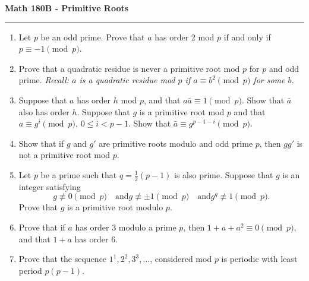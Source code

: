 \documentclass[11pt,letterpaper]{report}
\begin{document}
\begin{center}
{\bf \Large Math 180B - Primitive Roots}
\vspace{0.2cm}
\hrule
\end{center}

\begin{enumerate}
	\item Let $p$ be an odd prime. Prove that $a$ has order 2 mod $p$ if and only if $p\equiv -1 \pmod{p}$.
	\vfill

	\item Prove that a quadratic residue is never a primitive root mod $p$ for $p$ and odd prime. \textit{Recall: $a$ is a quadratic residue mod $p$ if $a \equiv b^2\pmod{p}$ for some $b$.}
	\vfill

	\item Suppose that $a$ has order $h$ mod $p$, and that $a\bar{a} \equiv 1\pmod{p}$. Show that $\bar{a}$ also has order $h$. Suppose that $g$ is a primitive root mod $p$ and that $a \equiv g^i\pmod{p}$, $0\leq i < p-1$. Show that $\bar{a} \equiv g^{p-1-i}\pmod{p}$.
	\vfill

	\item Show that if $g$ and $g'$ are primitive roots modulo and odd prime $p$, then $gg'$ is not a primitive root mod $p$.
	\vfill

	\item Let $p$ be a prime such that $q = \frac{1}{2}(p-1)$ is also prime. Suppose that $g$ is an integer satisfying
	\[
	g\not\equiv 0\pmod{p}\quad\text{and} g\not\equiv \pm 1\pmod{p}\quad\text{and} g^q\not\equiv 1\pmod{p}.
	\]
	Prove that $g$ is a primitive root modulo $p$.
	\vfill

	\item Prove that if $a$ has order 3 modulo a prime $p$, then $1+a+a^2 \equiv 0\pmod{p}$, and that $1+a$ has order 6.
	\vfill

	\item Prove that the sequence $1^1, 2^2, 3^3, \ldots$, considered mod $p$ is periodic with least period $p(p-1)$.
	\vfill
\end{enumerate}
\end{document}
